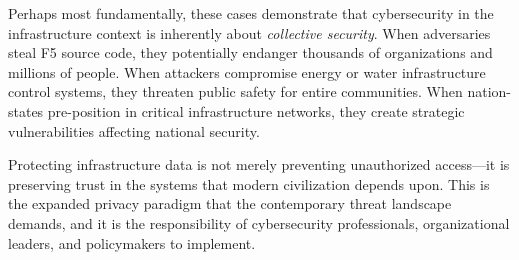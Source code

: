 \documentclass[sigconf,nonacm]{acmart}
\begin{document}
Perhaps most fundamentally, these cases demonstrate that cybersecurity in the
infrastructure context is inherently about \emph{collective security}. When adversaries
steal F5 source code, they potentially endanger thousands of organizations and millions
of people. When attackers compromise energy or water infrastructure control systems, they
threaten public safety for entire communities. When nation-states pre-position in
critical infrastructure networks, they create strategic vulnerabilities affecting
national security.

Protecting infrastructure data is not merely preventing unauthorized access---it is
preserving trust in the systems that modern civilization depends upon. This is the
expanded privacy paradigm that the contemporary threat landscape demands, and it is the
responsibility of cybersecurity professionals, organizational leaders, and policymakers
to implement.
\end{document}
